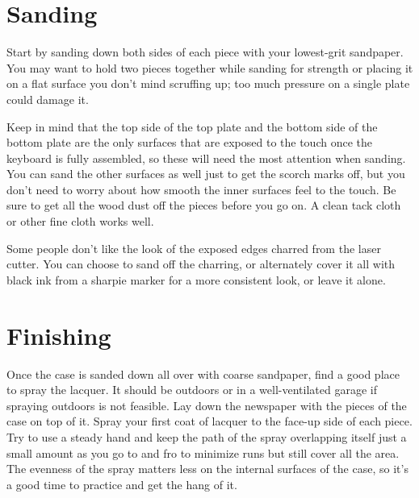 \documentclass{article}
\begin{document}
\section{Sanding}

Start by sanding down both sides of each piece with your lowest-grit
sandpaper. You may want to hold two pieces together while sanding for
strength or placing it on a flat surface you don't mind scruffing up;
too much pressure on a single plate could damage it.

\vspace{1em}
\noindent{}
\vspace{1em}

Keep in mind that the top side of the top plate and the bottom side of
the bottom plate are the only surfaces that are exposed to the touch
once the keyboard is fully assembled, so these will need the most
attention when sanding. You can sand the other surfaces as well just
to get the scorch marks off, but you don't need to worry about how
smooth the inner surfaces feel to the touch. Be sure to get all the
wood dust off the pieces before you go on. A clean tack cloth or other
fine cloth works well.

\vspace{1em}

Some people don't like the look of the exposed edges charred from the
laser cutter. You can choose to sand off the charring, or alternately
cover it all with black ink from a sharpie marker for a more
consistent look, or leave it alone.

\section{Finishing}

Once the case is sanded down all over with coarse sandpaper, find a
good place to spray the lacquer. It should be outdoors or in a
well-ventilated garage if spraying outdoors is not feasible. Lay down
the newspaper with the pieces of the case on top of it. Spray your
first coat of lacquer to the face-up side of each piece. Try to use a
steady hand and keep the path of the spray overlapping itself just a
small amount as you go to and fro to minimize runs but still cover all
the area. The evenness of the spray matters less on the internal
surfaces of the case, so it's a good time to practice and get the hang
of it.
\end{document}
